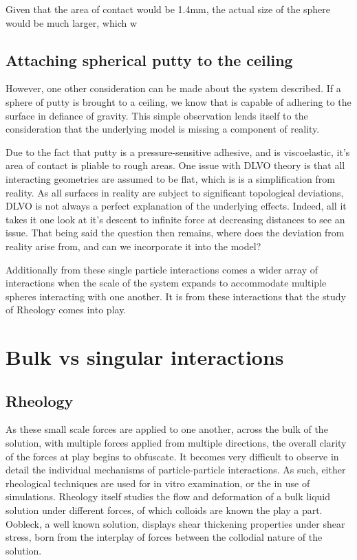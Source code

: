 Given that the area of contact would be 1.4mm, the actual size of the sphere would be much larger, which w


\subsection{Attaching spherical putty to the ceiling}

However, one other consideration can be made about the system described. If a sphere of putty is brought to a ceiling, we know that is capable of adhering to the surface in defiance of gravity. This simple observation lends itself to the consideration that the underlying model is missing a component of reality.

Due to the fact that putty is a pressure-sensitive adhesive, and is viscoelastic, it's area of contact is pliable to rough areas. One issue with DLVO theory is that all interacting geometries are assumed to be flat, which is is a simplification from reality. As all surfaces in reality are %
subject to significant topological deviations, DLVO is not always a perfect explanation of the underlying effects. Indeed, all it takes it one look at it's descent to infinite force at decreasing distances to see an issue. That being said the question then remains, where does the deviation from reality arise from, and can we incorporate it into the model?

Additionally from these single particle interactions comes a wider array of interactions when the scale of the system expands to accommodate multiple spheres interacting with one another. It is from these interactions that the study of Rheology comes into play. 

\newpage

\section{Bulk vs singular interactions}
\subsection{Rheology}

 As these small scale forces are applied to one another, across the bulk of the solution, with multiple forces applied from multiple directions, the overall clarity of the forces at play begins to obfuscate. It becomes very difficult to observe in detail the individual mechanisms of particle-particle interactions. As such, either rheological techniques are used for in vitro examination, or the in use of simulations. Rheology itself studies the flow and deformation of a bulk liquid solution under different forces, of which colloids are known the play a part. Oobleck, a well known solution, displays shear thickening properties under shear stress, born from the interplay of forces between the collodial nature of the solution.
 
